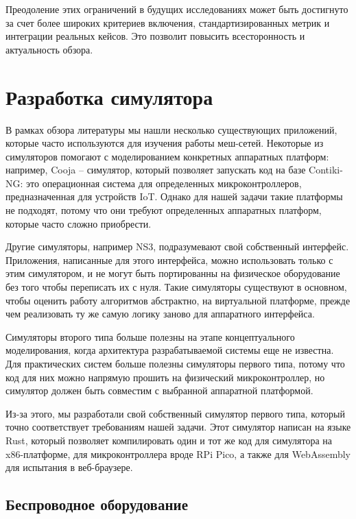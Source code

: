 \documentclass[%
]{report}
\begin{document}
Преодоление этих ограничений
в будущих исследованиях может быть
достигнуто за счет более широких критериев включения,
стандартизированных метрик и интеграции реальных кейсов.
Это позволит повысить всесторонность и актуальность обзора.


\chapter{Разработка симулятора} 
\label{sec:base-section}

В рамках обзора литературы мы нашли несколько существующих приложений,
которые часто используются для изучения работы меш-сетей.
Некоторые из симуляторов помогают с моделированием конкретных аппаратных платформ:
например, Cooja -- симулятор,
который позволяет запускать код на базе Contiki-NG:
это операционная система для определенных микроконтроллеров,
предназначенная для устройств IoT.
Однако для нашей задачи такие платформы не подходят,
потому что они требуют определенных аппаратных платформ,
которые часто сложно приобрести.

Другие симуляторы, например NS3,
подразумевают свой собственный интерфейс.
Приложения, написанные для этого интерфейса,
можно использовать только с этим симулятором,
и не могут быть портированны на физическое оборудование
без того чтобы переписать их с нуля.
Такие симуляторы существуют в основном,
чтобы оценить работу алгоритмов абстрактно,
на виртуальной платформе,
прежде чем реализовать ту же самую логику
заново для аппаратного интерфейса.

Симуляторы второго типа больше полезны на этапе концептуального моделирования,
когда архитектура разрабатываемой системы еще не известна.
Для практических систем больше полезны симуляторы первого типа,
потому что код для них можно напрямую прошить на физический микроконтроллер, 
но симулятор должен быть совместим с выбранной аппаратной платформой.

Из-за этого, мы разработали свой собственный симулятор первого типа,
который точно соответствует требованиям нашей задачи.
Этот симулятор написан на языке Rust,
который позволяет компилировать один и тот же код
для симулятора на x86-платформе,
для микроконтроллера вроде RPi Pico,
а также для WebAssembly для испытания в веб-браузере.

\section{Беспроводное оборудование}
\end{document}
